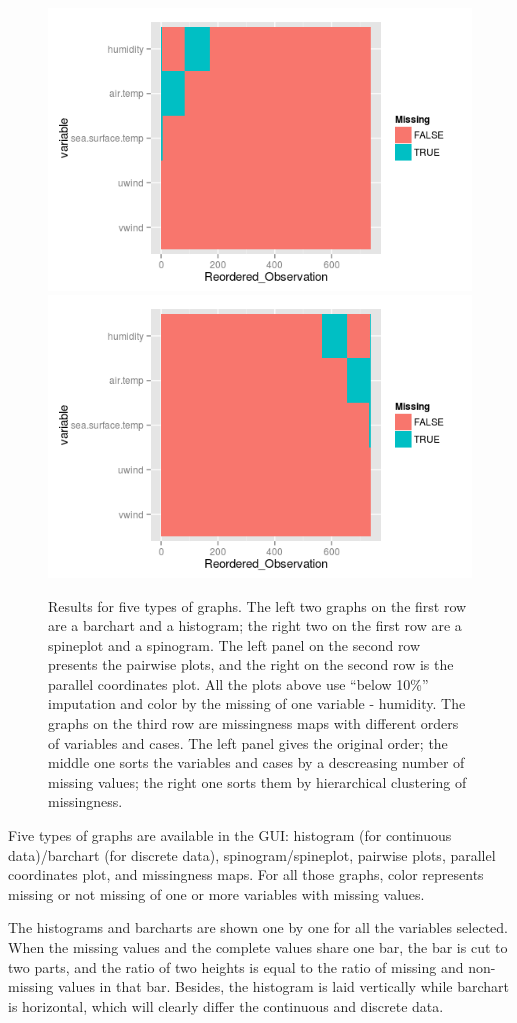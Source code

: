 \documentclass[article]{jss}
\begin{document}
\begin{center}
\begin{figure}[h]
\begin{centering}
\includegraphics[width=.32\textwidth]{fig5-3-2}
\includegraphics[width=.32\textwidth]{fig5-3-3}
\par\end{centering}

\caption{\label{fig:graphtypes}{Results for five types of graphs.
The left two graphs on the first row are a barchart and a histogram; the right two on the first row are a spineplot and a spinogram. The left panel on the second row presents the pairwise plots, and the right on the second row is the parallel coordinates plot. All the plots above use ``below 10\%'' imputation and color by the missing of one variable - humidity. The graphs on the third row are missingness maps with different orders of variables and cases. The left panel gives the original order; the middle one sorts the variables and cases by a descreasing number of missing values; the right one sorts them by hierarchical clustering of missingness.}}

\end{figure}

\par\end{center}

Five types of graphs are available in the GUI: histogram (for continuous data)/barchart (for discrete data), spinogram/spineplot, pairwise plots, parallel coordinates plot, and missingness maps. For all those graphs, color represents missing or not missing of one or more variables with missing values. 

The histograms and barcharts are shown one by one for all the variables selected. When the missing values and the complete values share one bar, the bar is cut to two parts, and the ratio of two heights is equal to the ratio of missing and non-missing values in that bar. Besides, the histogram is laid vertically while barchart is horizontal, which will clearly differ the continuous and discrete data.
\end{document}
